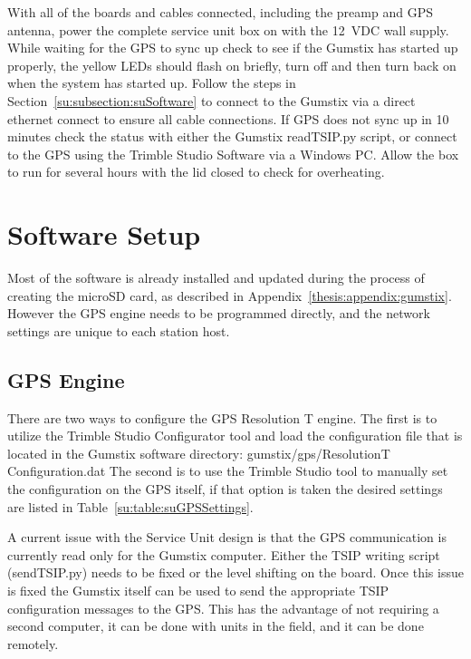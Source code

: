 With all of the boards and cables connected, including the preamp and GPS antenna, power the complete service unit box on with the 12~VDC wall supply.
While waiting for the GPS to sync up check to see if the Gumstix has started up properly, the yellow LEDs should flash on briefly, turn off and then turn back on when the system has started up.
Follow the steps in Section~\ref{su:subsection:suSoftware} to connect to the Gumstix via a direct ethernet connect to ensure all cable connections.
If GPS does not sync up in 10 minutes check the status with either the Gumstix readTSIP.py script, or connect to the GPS using the Trimble Studio Software via a Windows PC.
Allow the box to run for several hours with the lid closed to check for overheating.

\section{Software Setup}

Most of the software is already installed and updated during the process of creating the microSD card, as described in Appendix~\ref{thesis:appendix:gumstix}.
However the GPS engine needs to be programmed directly, and the network settings are unique to each station host.

\subsection{GPS Engine}

There are two ways to configure the GPS Resolution T engine.
The first is to utilize the Trimble Studio Configurator tool and load the configuration file that is located in the Gumstix software directory: gumstix/gps/ResolutionT Configuration.dat
The second is to use the Trimble Studio tool to manually set the configuration on the GPS itself, if that option is taken the desired settings are listed in Table~\ref{su:table:suGPSSettings}.

A current issue with the Service Unit design is that the GPS communication is currently read only for the Gumstix computer.
Either the TSIP writing script (sendTSIP.py) needs to be fixed or the level shifting on the board.
Once this issue is fixed the Gumstix itself can be used to send the appropriate TSIP configuration messages to the GPS.
This has the advantage of not requiring a second computer, it can be done with units in the field, and it can be done remotely.

